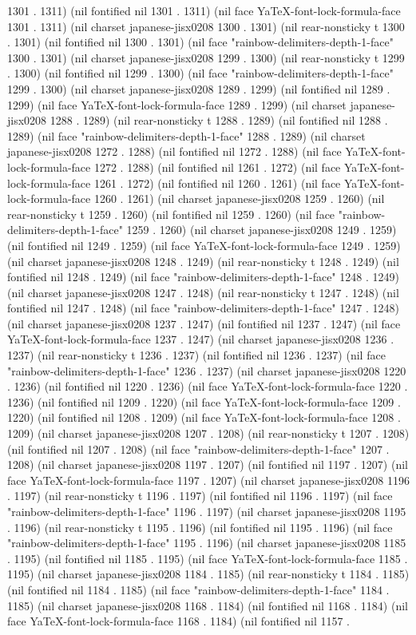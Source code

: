 1301 . 1311) (nil fontified nil 1301 . 1311) (nil face YaTeX-font-lock-formula-face 1301 . 1311) (nil charset japanese-jisx0208 1300 . 1301) (nil rear-nonsticky t 1300 . 1301) (nil fontified nil 1300 . 1301) (nil face "rainbow-delimiters-depth-1-face" 1300 . 1301) (nil charset japanese-jisx0208 1299 . 1300) (nil rear-nonsticky t 1299 . 1300) (nil fontified nil 1299 . 1300) (nil face "rainbow-delimiters-depth-1-face" 1299 . 1300) (nil charset japanese-jisx0208 1289 . 1299) (nil fontified nil 1289 . 1299) (nil face YaTeX-font-lock-formula-face 1289 . 1299) (nil charset japanese-jisx0208 1288 . 1289) (nil rear-nonsticky t 1288 . 1289) (nil fontified nil 1288 . 1289) (nil face "rainbow-delimiters-depth-1-face" 1288 . 1289) (nil charset japanese-jisx0208 1272 . 1288) (nil fontified nil 1272 . 1288) (nil face YaTeX-font-lock-formula-face 1272 . 1288) (nil fontified nil 1261 . 1272) (nil face YaTeX-font-lock-formula-face 1261 . 1272) (nil fontified nil 1260 . 1261) (nil face YaTeX-font-lock-formula-face 1260 . 1261) (nil charset japanese-jisx0208 1259 . 1260) (nil rear-nonsticky t 1259 . 1260) (nil fontified nil 1259 . 1260) (nil face "rainbow-delimiters-depth-1-face" 1259 . 1260) (nil charset japanese-jisx0208 1249 . 1259) (nil fontified nil 1249 . 1259) (nil face YaTeX-font-lock-formula-face 1249 . 1259) (nil charset japanese-jisx0208 1248 . 1249) (nil rear-nonsticky t 1248 . 1249) (nil fontified nil 1248 . 1249) (nil face "rainbow-delimiters-depth-1-face" 1248 . 1249) (nil charset japanese-jisx0208 1247 . 1248) (nil rear-nonsticky t 1247 . 1248) (nil fontified nil 1247 . 1248) (nil face "rainbow-delimiters-depth-1-face" 1247 . 1248) (nil charset japanese-jisx0208 1237 . 1247) (nil fontified nil 1237 . 1247) (nil face YaTeX-font-lock-formula-face 1237 . 1247) (nil charset japanese-jisx0208 1236 . 1237) (nil rear-nonsticky t 1236 . 1237) (nil fontified nil 1236 . 1237) (nil face "rainbow-delimiters-depth-1-face" 1236 . 1237) (nil charset japanese-jisx0208 1220 . 1236) (nil fontified nil 1220 . 1236) (nil face YaTeX-font-lock-formula-face 1220 . 1236) (nil fontified nil 1209 . 1220) (nil face YaTeX-font-lock-formula-face 1209 . 1220) (nil fontified nil 1208 . 1209) (nil face YaTeX-font-lock-formula-face 1208 . 1209) (nil charset japanese-jisx0208 1207 . 1208) (nil rear-nonsticky t 1207 . 1208) (nil fontified nil 1207 . 1208) (nil face "rainbow-delimiters-depth-1-face" 1207 . 1208) (nil charset japanese-jisx0208 1197 . 1207) (nil fontified nil 1197 . 1207) (nil face YaTeX-font-lock-formula-face 1197 . 1207) (nil charset japanese-jisx0208 1196 . 1197) (nil rear-nonsticky t 1196 . 1197) (nil fontified nil 1196 . 1197) (nil face "rainbow-delimiters-depth-1-face" 1196 . 1197) (nil charset japanese-jisx0208 1195 . 1196) (nil rear-nonsticky t 1195 . 1196) (nil fontified nil 1195 . 1196) (nil face "rainbow-delimiters-depth-1-face" 1195 . 1196) (nil charset japanese-jisx0208 1185 . 1195) (nil fontified nil 1185 . 1195) (nil face YaTeX-font-lock-formula-face 1185 . 1195) (nil charset japanese-jisx0208 1184 . 1185) (nil rear-nonsticky t 1184 . 1185) (nil fontified nil 1184 . 1185) (nil face "rainbow-delimiters-depth-1-face" 1184 . 1185) (nil charset japanese-jisx0208 1168 . 1184) (nil fontified nil 1168 . 1184) (nil face YaTeX-font-lock-formula-face 1168 . 1184) (nil fontified nil 1157 . 